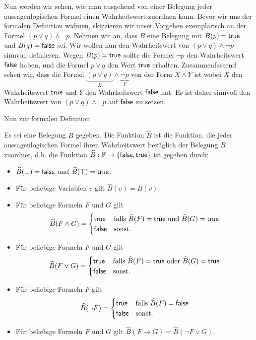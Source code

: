 Nun werden wir sehen, wie man ausgehend von einer Belegung jeder aussagenlogischen Formel einen Wahrheitswert zuordnen
kann. Bevor wir uns der formalen Definition widmen, skizzieren wir unser Vorgehen exemplarisch an der Formel $(p\lor q)\land
\neg p$. Nehmen wir an, dass $B$ eine Belegung mit $B(p)=\mathsf{true}$ und $B(q)=\mathsf{false}$ sei.
Wir wollen
nun den Wahrheitswert von $(p\lor q)\land \neg p$ sinnvoll definieren. Wegen $B(p)=\mathsf{true}$
sollte die Formel $\neg p$ den Wahrheitswert $\mathsf{false}$ haben, und die Formel $p\lor q$ den
Wert
$\mathsf{true}$ erhalten. Zusammenfassend sehen wir, dass die Formel $\underbrace{(p\lor
q)}_{X}\land \underbrace{\neg p}_{Y}$ von der Form $X\land Y$ ist wobei $X$ den
Wahrheitswert $\mathsf{true}$ und $Y$ den Wahrheitswert $\mathsf{false}$ hat. Es ist daher sinnvoll den
Wahrheitswert von $(p\lor q)\land \neg p$ auf $\mathsf{false}$ zu setzen.

Nun zur formalen Definition
\begin{df}
Es sei eine Belegung $B$ gegeben. Die Funktion $\widehat{B}$ ist die Funktion, die jeder
aussagenlogischen Formel ihren Wahrheitswert bezüglich der Belegung $B$ zuordnet, d.h.
die Funktion $\widehat{B}:\mathbb{F}\to\{\mathsf{false},\mathsf{true}\}$ ist gegeben durch:
\begin{itemize}
\item $\widehat{B}(\bot) =\mathsf{false}$ und $\widehat{B}(\top)=\mathsf{true}$.
\item Für beliebige Variablen $v$ gilt $\widehat{B}(v)=B(v)$.
\item Für beliebige Formeln $F$ und $G$ gilt\[
\widehat{B}(F\land G)=\begin{cases}
\mathsf{true} &\text{falls }\widehat{B}(F)=\mathsf{true}\text{ und }\widehat{B}(G)=\mathsf{true}\\
\mathsf{false}&\text{sonst.}
\end{cases}
\]
\item Für beliebige Formeln $F$ und $G$ gilt
\[
\widehat{B}(F\lor G)=\begin{cases}
\mathsf{true}&\text{falls }\widehat{B}(F)=\mathsf{true}\text{ oder }\widehat{B}(G)=\mathsf{true}\\
\mathsf{false}&\text{sonst.}
\end{cases}
\]
\item Für beliebige Formeln $F$  gilt\[
\widehat{B}(\neg F)=\begin{cases}
\mathsf{true}&\text{falls }\widehat{B}(F)=\mathsf{false} \\
\mathsf{false}&\text{sonst.}
\end{cases}
\]
\item Für beliebige Formeln $F$ und $G$ gilt $\widehat{B}(F\to G)=\widehat{B}(\neg F\lor G)$.
\end{itemize}
\end{df}

